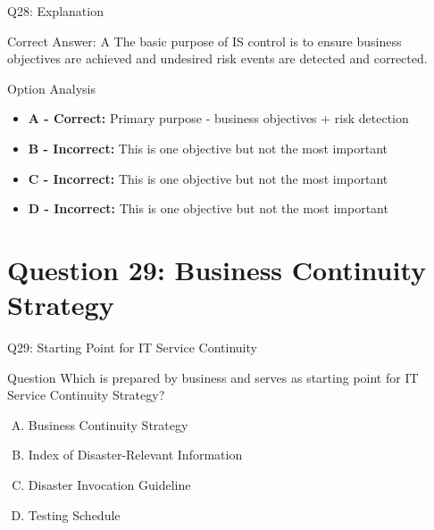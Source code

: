 \documentclass{beamer}
\begin{document}
	\begin{frame}{Q28: Explanation}
		\begin{block}{Correct Answer: A}
			The basic purpose of IS control is to ensure business objectives are achieved and undesired risk events are detected and corrected.
		\end{block}
		\begin{block}{Option Analysis}
			\begin{itemize}
				\item \textbf{A - Correct:} Primary purpose - business objectives + risk detection
				\item \textbf{B - Incorrect:} This is one objective but not the most important
				\item \textbf{C - Incorrect:} This is one objective but not the most important
				\item \textbf{D - Incorrect:} This is one objective but not the most important
			\end{itemize}
		\end{block}
	\end{frame}
	
	\section{Question 29: Business Continuity Strategy}
	
	\begin{frame}{Q29: Starting Point for IT Service Continuity}
		\begin{block}{Question}
			Which is prepared by business and serves as starting point for IT Service Continuity Strategy?
		\end{block}
		\begin{enumerate}[(A)]
			\item Business Continuity Strategy
			\item Index of Disaster-Relevant Information
			\item Disaster Invocation Guideline
			\item Testing Schedule
		\end{enumerate}
	\end{frame}
	
\end{document}
